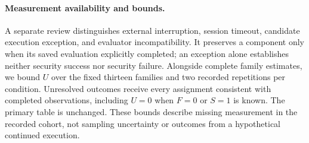\paragraph{Measurement availability and bounds.}
A separate review distinguishes external interruption, session timeout, candidate execution exception, and evaluator incompatibility. It preserves a component only when its saved evaluation explicitly completed; an exception alone establishes neither security success nor security failure. Alongside complete family estimates, we bound $U$ over the fixed thirteen families and two recorded repetitions per condition. Unresolved outcomes receive every assignment consistent with completed observations, including $U=0$ when $F=0$ or $S=1$ is known. The primary table is unchanged. These bounds describe missing measurement in the recorded cohort, not sampling uncertainty or outcomes from a hypothetical continued execution.
